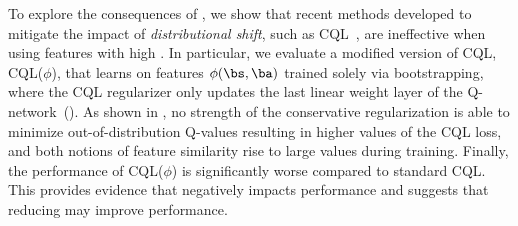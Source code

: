 To explore the consequences of \aliasingproblemname, we show that recent methods developed to mitigate the impact of \emph{distributional shift}, such as CQL~\citep{kumar2020conservative}, are ineffective when using features with high \aliasingproblemname. In particular, we evaluate a modified version of CQL, CQL($\phi$), that learns on features $\phi(\bs, \ba)$ trained solely via bootstrapping,
where the CQL regularizer only updates the last linear weight layer of the Q-network~(). As shown in , no strength of the conservative regularization is able to minimize out-of-distribution Q-values resulting in higher values of the CQL loss, and both notions of feature similarity rise to large values during training. Finally, the performance of CQL($\phi$) is significantly worse compared to standard CQL. This provides evidence that \aliasingproblemname negatively impacts performance and suggests that reducing \aliasingproblemname may improve performance.

